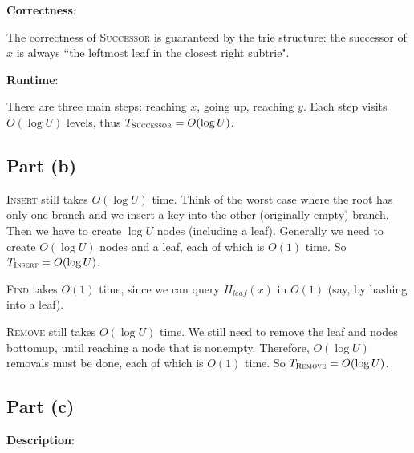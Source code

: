 \documentclass{article}
\begin{document}
\noindent\textbf{Correctness}:

The correctness of \textsc{Successor} is guaranteed by the trie structure: the successor of $x$ is always ``the leftmost leaf in the closest right subtrie".

\noindent\textbf{Runtime}:

There are three main steps: reaching $x$, going up, reaching $y$. Each step visits $O(\log U)$ levels, thus $T_{\textsc{Successor}}=O(\log U)$.

\subsection{Part (b)}
\textsc{Insert} still takes $O(\log U)$ time. Think of the worst case where the root has only one branch and we insert a key into the other (originally empty) branch. Then we have to create $\log U$ nodes (including a leaf). Generally we need to create $O(\log U)$ nodes and a leaf, each of which is $O(1)$ time. So $T_{\textsc{Insert}}=O(\log U)$.

\textsc{Find} takes $O(1)$ time, since we can query $H_{leaf}(x)$ in $O(1)$ (say, by hashing into a leaf).

\textsc{Remove} still takes $O(\log U)$ time. We still need to remove the leaf and nodes bottomup, until reaching a node that is nonempty. Therefore, $O(\log U)$ removals must be done, each of which is $O(1)$ time. So $T_{\textsc{Remove}}=O(\log U)$.

\subsection{Part (c)}
\noindent\textbf{Description}:
\end{document}
